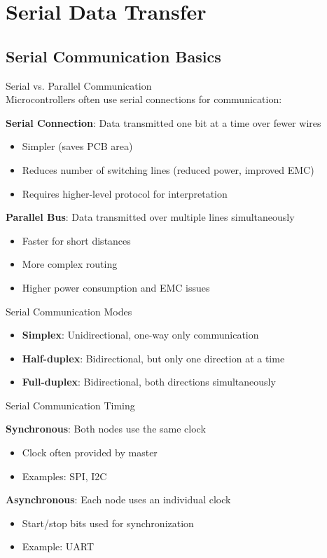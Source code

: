 \section{Serial Data Transfer}

\subsection{Serial Communication Basics}


\begin{concept}{Serial vs. Parallel Communication}\\
Microcontrollers often use serial connections for communication:

\textbf{Serial Connection}: Data transmitted one bit at a time over fewer wires
    \begin{itemize}
        \item Simpler (saves PCB area)
        \item Reduces number of switching lines (reduced power, improved EMC)
        \item Requires higher-level protocol for interpretation
    \end{itemize}
\textbf{Parallel Bus}: Data transmitted over multiple lines simultaneously
    \begin{itemize}
        \item Faster for short distances
        \item More complex routing
        \item Higher power consumption and EMC issues
    \end{itemize}
\end{concept}

\begin{definition}{Serial Communication Modes}
\begin{itemize}
    \item \textbf{Simplex}: Unidirectional, one-way only communication
    \item \textbf{Half-duplex}: Bidirectional, but only one direction at a time
    \item \textbf{Full-duplex}: Bidirectional, both directions simultaneously
\end{itemize}
\end{definition}

\begin{definition}{Serial Communication Timing}

    \textbf{Synchronous}: Both nodes use the same clock
    \begin{itemize}
        \item Clock often provided by master
        \item Examples: SPI, I2C
    \end{itemize}
\textbf{Asynchronous}: Each node uses an individual clock
    \begin{itemize}
        \item Start/stop bits used for synchronization
        \item Example: UART
    \end{itemize}
\end{definition}

